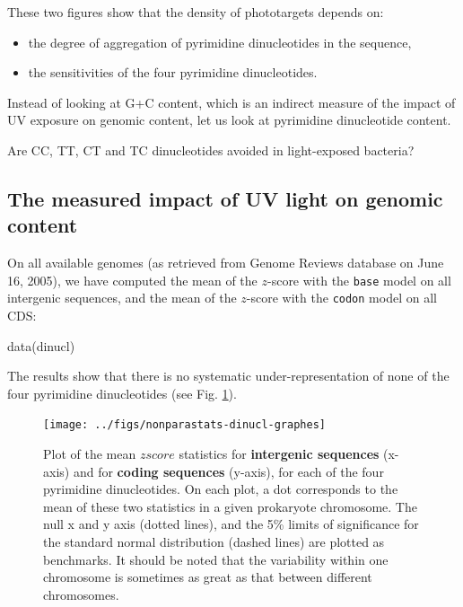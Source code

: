 \documentclass{article}
\begin{document}
These two figures show that the density of phototargets depends on:

\begin{itemize}
\item the degree of aggregation of pyrimidine dinucleotides in the
sequence,
\item the sensitivities of the four pyrimidine dinucleotides.
  \end{itemize}

Instead of looking at G+C content, which is an indirect measure of the
impact of UV exposure on genomic content, let us look at pyrimidine
dinucleotide content.

Are CC, TT, CT and TC dinucleotides avoided in light-exposed bacteria?

\subsection{The measured impact of UV light on genomic content}

On all available genomes (as retrieved from Genome Reviews database on
June 16, 2005), we have computed the mean of the $z$-score with
the \texttt{base} model on all intergenic sequences, and the mean of
the $z$-score with the \texttt{codon} model on all CDS:

\begin{Schunk}
\begin{Sinput}
 data(dinucl)
\end{Sinput}
\end{Schunk}

The results show that there is no systematic under-representation of
none of the four pyrimidine dinucleotides (see Fig.
\ref{dinucl-graphes}).

\begin{figure}[H]
   \begin{center}
\texttt{[image: ../figs/nonparastats-dinucl-graphes]}
\end{center}
   \caption{Plot of the mean $zscore$ statistics for
   \textbf{intergenic sequences} (x-axis) and for \textbf{coding
   sequences} (y-axis), for each of the four pyrimidine dinucleotides.
   On each plot, a dot corresponds to the mean of these two statistics
   in a given prokaryote chromosome. The null x and y axis (dotted
   lines), and the 5\% limits of significance for the standard normal
   distribution (dashed lines) are plotted as benchmarks. It should be
   noted that the variability within one chromosome is sometimes as
   great as that between different chromosomes.}
\label{dinucl-graphes}
\end{figure}
\end{document}
